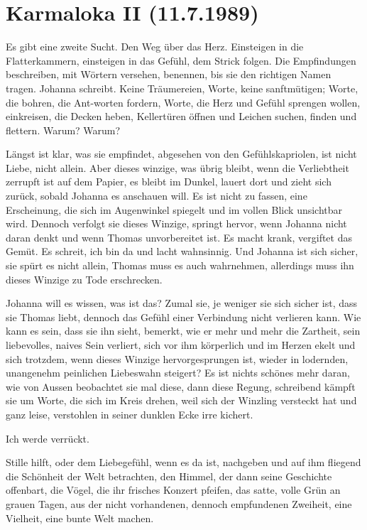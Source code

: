 \documentclass[10pt,titlepage,a5paper]{book}
\begin{document}
\section*{Karmaloka II (11.7.1989)}



Es gibt eine zweite Sucht. Den Weg über das Herz. Einsteigen in die Flatterkammern, einsteigen in das Gefühl, dem Strick folgen. Die Empfindungen beschreiben, mit Wörtern versehen, benennen, bis sie den richtigen Namen tragen. Johanna schreibt. Keine Träumereien, Worte, keine sanftmütigen; Worte, die bohren, die Ant-worten fordern, Worte, die Herz und Gefühl sprengen wollen, einkreisen, die Decken heben, Kellertüren öffnen und Leichen suchen, finden und flettern. Warum? Warum?

Längst ist klar, was sie empfindet, abgesehen von den Gefühlskapriolen, ist nicht Liebe, nicht allein. Aber dieses winzige, was übrig bleibt, wenn die Verliebtheit zerrupft ist auf dem Papier, es bleibt im Dunkel, lauert dort und zieht sich zurück, sobald Johanna es anschauen will. Es ist nicht zu fassen, eine Erscheinung, die sich im Augenwinkel spiegelt und im vollen Blick unsichtbar wird. Dennoch verfolgt sie dieses Winzige, springt hervor, wenn Johanna nicht daran denkt und wenn Thomas unvorbereitet ist. Es macht krank, vergiftet das Gemüt. Es schreit, ich bin da und lacht wahnsinnig. Und Johanna ist sich sicher, sie spürt es nicht allein, Thomas muss es auch wahrnehmen, allerdings muss ihn dieses Winzige zu Tode erschrecken.

Johanna will es wissen, was ist das? Zumal sie, je weniger sie sich sicher ist, dass sie Thomas liebt, dennoch das Gefühl einer Verbindung nicht verlieren kann. Wie kann es sein, dass sie ihn sieht, bemerkt, wie er mehr und mehr die Zartheit, sein liebevolles, naives Sein verliert, sich vor ihm körperlich und im Herzen ekelt und sich trotzdem, wenn dieses Winzige hervorgesprungen ist, wieder in lodernden, unangenehm peinlichen Liebeswahn steigert? Es ist nichts schönes mehr daran, wie von Aussen beobachtet sie mal diese, dann diese Regung, schreibend kämpft sie um Worte, die sich im Kreis drehen, weil sich der Winzling versteckt hat und ganz leise, verstohlen in seiner dunklen Ecke irre kichert.

Ich werde verrückt. 

Stille hilft, oder dem Liebegefühl, wenn es da ist, nachgeben und auf ihm fliegend die Schönheit der Welt betrachten, den Himmel, der dann seine Geschichte offenbart, die Vögel, die ihr frisches Konzert pfeifen, das satte, volle Grün an grauen Tagen, aus der nicht vorhandenen, dennoch empfundenen Zweiheit, eine Vielheit, eine bunte Welt machen.
\end{document}
